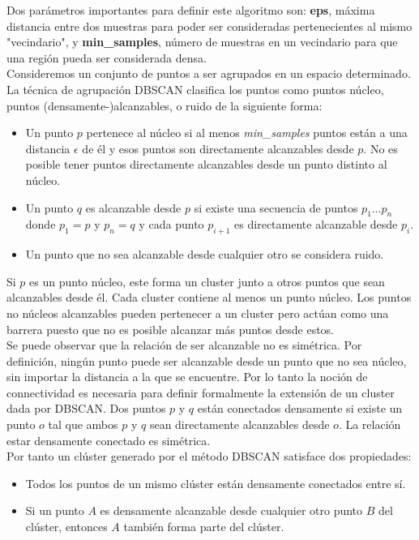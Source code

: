 \documentclass[a4paper, 20pt]{article}
\begin{document}
Dos parámetros importantes para definir este algoritmo son: \textbf{eps}, máxima distancia entre dos muestras para poder ser consideradas pertenecientes al mismo "vecindario", y \textbf{min\_samples}, número de muestras en un vecindario para que una región pueda ser considerada densa.\\

Consideremos un conjunto de puntos a ser agrupados en un espacio determinado. La técnica de agrupación DBSCAN clasifica los puntos como puntos núcleo, puntos (densamente-)alcanzables, o ruido de la siguiente forma:

\begin{itemize}
\item Un punto $p$ pertenece al núcleo si al menos \textit{min\_samples} puntos están a una distancia $\epsilon$ de él y esos puntos son directamente alcanzables desde $p$. No es posible tener puntos directamente alcanzables desde un punto distinto al núcleo.
\item Un punto $q$ es alcanzable desde $p$ si existe una secuencia de puntos $p_1\dots p_n$ donde $p_1=p$ y $p_n=q$ y cada punto $p_{i+1}$ es directamente alcanzable desde $p_i$.
\item Un punto que no sea alcanzable desde cualquier otro se considera ruido.
\end{itemize}

Si $p$ es un punto núcleo, este forma un cluster junto a otros puntos que sean alcanzables desde él. Cada cluster contiene al menos un punto núcleo. Los puntos no núcleos alcanzables pueden pertenecer a un cluster pero actúan como una barrera puesto que no es posible alcanzar más puntos desde estos.\\

Se puede observar que la relación de ser alcanzable no es simétrica. Por definición, ningún punto puede ser alcanzable desde un punto que no sea núcleo, sin importar la distancia a la que se encuentre. Por lo tanto la noción de connectividad es necesaria para definir formalmente la extensión de un cluster dada por DBSCAN. Dos puntos $p$ y $q$ están conectados densamente si existe un punto $o$ tal que ambos $p$ y $q$ sean directamente alcanzables desde $o$. La relación estar densamente conectado es simétrica.\\

Por tanto un clúster generado por el método DBSCAN satisface dos propiedades:

\begin{itemize}
\item Todos los puntos de un mismo clúster están densamente conectados entre sí.
\item Si un punto $A$ es densamente alcanzable desde cualquier otro punto $B$ del clúster, entonces $A$ también forma parte del clúster.
\end{itemize}
\end{document}
